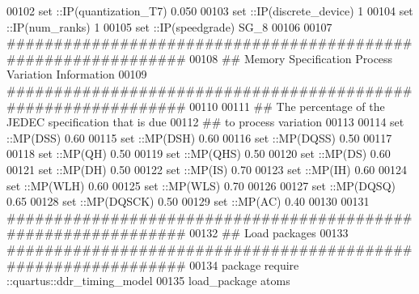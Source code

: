 \begin{DoxyCode}
00102 \textcolor{comment}{}\textcolor{keyword}{set} ::IP(quantization\_T7) 0.050\textcolor{comment}{}
00103 \textcolor{comment}{}\textcolor{keyword}{set} ::IP(discrete\_device) 1\textcolor{comment}{}
00104 \textcolor{comment}{}\textcolor{keyword}{set} ::IP(num\_ranks) 1\textcolor{comment}{}
00105 \textcolor{comment}{}\textcolor{keyword}{set} ::IP(speedgrade) SG\_8\textcolor{comment}{}
00106 \textcolor{comment}{}
00107 \textcolor{comment}{##############################################################}
00108 \textcolor{comment}{}\textcolor{comment}{## Memory Specification Process Variation Information}
00109 \textcolor{comment}{}\textcolor{comment}{##############################################################}
00110 \textcolor{comment}{}
00111 \textcolor{comment}{## The percentage of the JEDEC specification that is due}
00112 \textcolor{comment}{}\textcolor{comment}{## to process variation }
00113 \textcolor{comment}{}
00114 \textcolor{keyword}{set} ::MP(DSS) 0.60\textcolor{comment}{}
00115 \textcolor{comment}{}\textcolor{keyword}{set} ::MP(DSH) 0.60\textcolor{comment}{}
00116 \textcolor{comment}{}\textcolor{keyword}{set} ::MP(DQSS) 0.50\textcolor{comment}{}
00117 \textcolor{comment}{}
00118 \textcolor{keyword}{set} ::MP(QH) 0.50\textcolor{comment}{}
00119 \textcolor{comment}{}\textcolor{keyword}{set} ::MP(QHS) 0.50\textcolor{comment}{}
00120 \textcolor{comment}{}\textcolor{keyword}{set} ::MP(DS) 0.60\textcolor{comment}{}
00121 \textcolor{comment}{}\textcolor{keyword}{set} ::MP(DH) 0.50\textcolor{comment}{}
00122 \textcolor{comment}{}\textcolor{keyword}{set} ::MP(IS) 0.70\textcolor{comment}{}
00123 \textcolor{comment}{}\textcolor{keyword}{set} ::MP(IH) 0.60\textcolor{comment}{}
00124 \textcolor{comment}{}\textcolor{keyword}{set} ::MP(WLH) 0.60\textcolor{comment}{}
00125 \textcolor{comment}{}\textcolor{keyword}{set} ::MP(WLS) 0.70\textcolor{comment}{}
00126 \textcolor{comment}{}
00127 \textcolor{keyword}{set} ::MP(DQSQ) 0.65\textcolor{comment}{}
00128 \textcolor{comment}{}\textcolor{keyword}{set} ::MP(DQSCK) 0.50\textcolor{comment}{}
00129 \textcolor{comment}{}\textcolor{keyword}{set} ::MP(AC) 0.40\textcolor{comment}{}
00130 \textcolor{comment}{}
00131 \textcolor{comment}{##############################################################}
00132 \textcolor{comment}{}\textcolor{comment}{## Load packages}
00133 \textcolor{comment}{}\textcolor{comment}{##############################################################}
00134 \textcolor{comment}{}\textcolor{keyword}{package} require ::quartus::ddr\_timing\_model\textcolor{comment}{}
00135 \textcolor{comment}{}load\_package atoms\textcolor{comment}{}

\end{DoxyCode}
